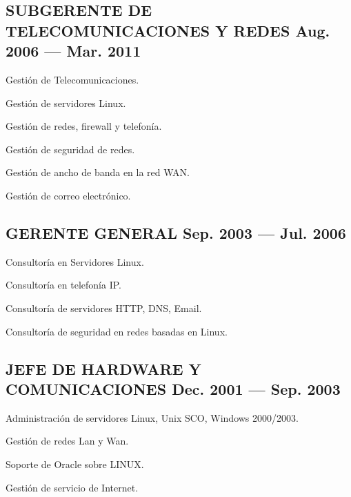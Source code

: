 \documentclass[letter,10pt]{article}
\begin{document}
\subsection{{SUBGERENTE DE TELECOMUNICACIONES Y REDES  \hfill Aug. 2006 --- Mar. 2011}}
\begin{zitemize}
\item	Gestión de Telecomunicaciones.
\item	Gestión de servidores Linux.
\item	Gestión de redes, firewall y telefonía.
\item	Gestión de seguridad de redes.
\item	Gestión de ancho de banda en la red WAN.
\item	Gestión de correo electrónico.	
\end{zitemize}
\vspace*{2mm}
\subsection{{GERENTE GENERAL \hfill Sep. 2003 --- Jul. 2006}}
\begin{zitemize}
\item	Consultoría en Servidores Linux.
\item	Consultoría en telefonía IP.
\item	Consultoría de servidores HTTP, DNS, Email.
\item	Consultoría de seguridad en redes basadas en Linux.	
\end{zitemize}
\vspace*{2mm}
\subsection{{JEFE DE HARDWARE Y COMUNICACIONES \hfill Dec. 2001 --- Sep. 2003}}
\begin{zitemize}
\item	Administración  de servidores Linux, Unix SCO, Windows 2000/2003.
\item	Gestión de redes Lan y Wan.
\item	Soporte de Oracle sobre LINUX.
\item	Gestión de servicio de Internet.	
\end{zitemize}
\vspace*{2mm}
\end{document}
